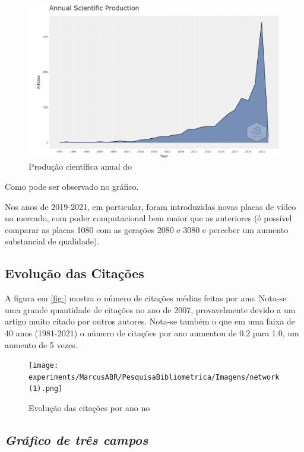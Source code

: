 \begin{figure}[ht]
    \centering
    \includegraphics[width=12cm]{experiments/enzoyoshio/AnaliseBibliometrica/anualScientificProduction.png}
    \caption{ Produção científica anual do \dataset\ }
    \label{fig:evo}
\end{figure}

Como pode ser observado no gráfico.

Nos anos de 2019-2021, em particular, foram introduzidas novas placas de vídeo no mercado, com poder computacional bem maior que as anteriores (é possível comparar as placas 1080 com as gerações 2080 e 3080 e perceber um aumento substancial de qualidade).

\subsection{Evolução das Citações}

A figura em \ref{fig:} mostra o número de citações médias feitas por ano. Nota-se uma grande quantidade de citações no ano de 2007, provavelmente devido a um artigo muito citado por outros autores. Nota-se também o que em uma faixa de 40 anos (1981-2021) o número de citações por ano aumentou de 0.2 para 1.0, um aumento de 5 vezes.

\begin{figure}[ht]
    \centering
    \texttt{[image: experiments/MarcusABR/PesquisaBibliometrica/Imagens/network(1).png]}
    \caption{Evolução das citações por ano no \textit{}}
    \label{fig:gpu-citation-year}
\end{figure}

\subsection{\textit{Gráfico de três campos}}

